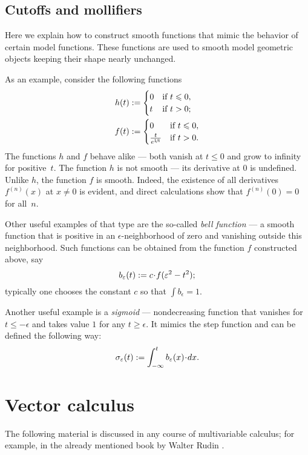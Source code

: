 \begin{multicols}{2}
{\subsection*{Cutoffs and mollifiers}


Here we explain how to construct smooth functions that mimic the behavior of certain model functions.
These functions are used to smooth model geometric objects keeping their shape nearly unchanged.

As an example, consider the following functions
\begin{align*}
h(t)&\mathrel{:=}
\begin{cases}
0&\text{if}\ t\leqslant 0,
\\
t&\text{if}\ t> 0;
\end{cases}
\\
f(t)&\mathrel{:=}
\begin{cases}
0&\text{if}\ t\leqslant 0,
\\
\frac{t}{e^{1\!/\!t}}&\text{if}\ t> 0.
\end{cases}
\end{align*}
The functions $h$ and $f$ behave alike ---
both vanish at $t\le 0$ and grow to infinity for positive~$t$.
The function $h$ is not smooth --- its derivative at $0$ is undefined.
Unlike $h$, the function $f$ is smooth.
Indeed, the existence of all derivatives $f^{(n)}(x)$ at $x\ne 0$ is evident, and direct calculations show that $f^{(n)}(0)=0$ for all~$n$.

Other useful examples of that type are the so-called \emph{bell function} --- a smooth function that is positive in an $\epsilon$-neighborhood of zero and vanishing outside this neighborhood.
Such functions can be obtained from the function $f$ constructed above, say 
\[b_\epsilon(t)\df c\cdot f(\epsilon^2-t^2);\]
typically one chooses the constant $c$ so that $\int b_\epsilon=1$.


Another useful example is a \emph{sigmoid} --- nondecreasing function that vanishes for $t\le -\epsilon$ and takes value $1$ for any $t\ge \epsilon$.
It mimics the step function and can be defined the following way: \label{page:sigma-function}
\[\sigma_\epsilon(t)
\df 
\int_{-\infty}^t b_\epsilon(x)\cdot dx.\]

\section{Vector calculus}\label{sec:Multivariable calculus}

The following material is discussed in any course of multivariable calculus;
for example, in the already mentioned book by Walter Rudin \cite{rudin}.

}
\end{multicols}
